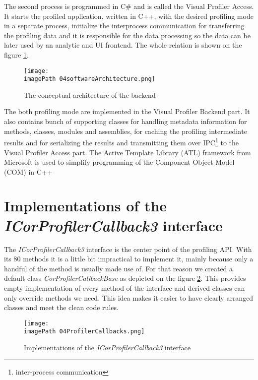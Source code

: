 The second process is programmed in C\# and is called the Visual Profiler Access. It starts the profiled application, written in C++, with the desired profiling mode in a separate process, initialize the interprocess communication for transferring the profiling data and it is responsible for the data processing so the data can be later used by an analytic and UI frontend. The whole relation is shown on the figure  \ref{fig:04softwareArchitecture}.

\begin{figure}
	\centering
		\texttt{[image: \\imagePath 04softwareArchitecture.png]}
		\caption{The conceptual architecture of the backend}
	\label{fig:04softwareArchitecture}
\end{figure}

The both profiling mode are implemented in the Visual Profiler Backend part. It also contains bunch of supporting classes for handling metadata information for methods, classes, modules and assemblies, for caching the profiling intermediate results and for serializing the results and transmitting them over IPC\footnote{inter-process communication} to the Visual Profiler Access part. The Active Template Library (ATL) framework from Microsoft is used to simplify programming of the Component Object Model (COM) in C++

\section{Implementations of the \textit{ICorProfilerCallback3 } interface}
The \textit{ICorProfilerCallback3} interface is the center point of the profiling API. With its 80 methods it is a little bit impractical to implement it, mainly because only a handful of the method is usually made use of. For that reason we created a default class \textit{CorProfilerCallbackBase} as depicted on the figure \ref{fig:04ProfilerCallbacks}. This provides empty implementation of every method of the interface and derived classes can only override methods we need. This idea makes it easier to have clearly arranged classes and meet the clean code rules.

\begin{figure}
	\centering
		\texttt{[image: \\imagePath 04ProfilerCallbacks.png]}
		\caption{Implementations of the \textit{ICorProfilerCallback3} interface}
	\label{fig:04ProfilerCallbacks}
\end{figure}

